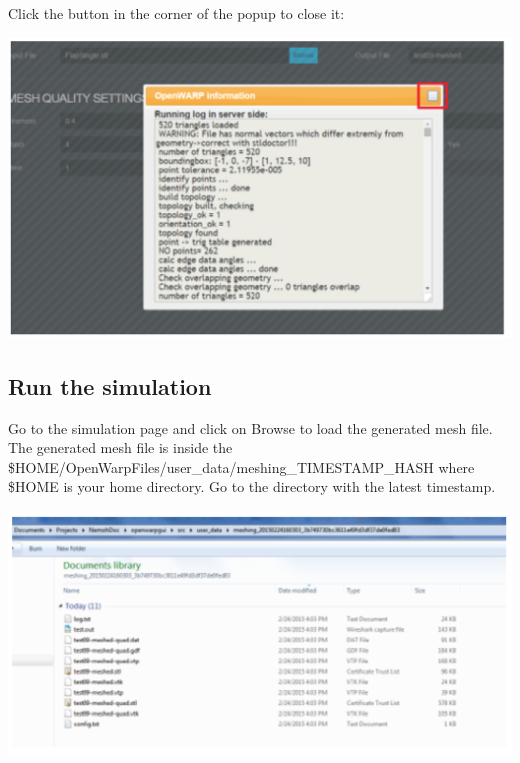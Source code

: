 \documentclass[12pt]{article}
\begin{document}
Click the button in the corner of the popup to close it:

\vspace{\abovedisplayskip}
\begin{minipage}{\linewidth}
	\centering
	\includegraphics[scale=0.5]{img/46}
\end{minipage}
\vspace{\belowdisplayskip}

\subsection{Run the simulation}

Go to the simulation page and click on Browse to load the generated mesh file.
The generated mesh file is inside the \$HOME/OpenWarpFiles/user{\_}data/meshing_TIMESTAMP_HASH where
\$HOME is your home directory. Go to the directory with the latest timestamp.

\vspace{\abovedisplayskip}
\begin{minipage}{\linewidth}
	\centering
	\includegraphics[scale=0.5]{img/47}
\end{minipage}
\vspace{\belowdisplayskip}
\end{document}
